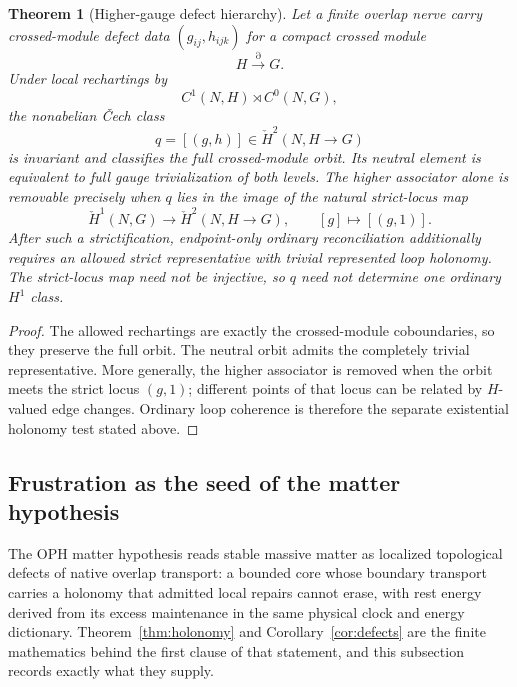 \documentclass[11pt]{article}
\newtheorem{theorem}{Theorem}[section]
\theoremstyle{remark}
\theoremstyle{plain}
\begin{document}
\begin{theorem}[Higher-gauge defect hierarchy]\label{thm:higherdefects}
Let a finite overlap nerve carry crossed-module defect data \((g_{ij},h_{ijk})\) for a compact crossed module
\[
H\xrightarrow{\partial} G.
\]
Under local rechartings by
\[
C^1(N,H)\rtimes C^0(N,G),
\]
the nonabelian \v{C}ech class
\[
q=[(g,h)]\in \check H^2(N,H\to G)
\]
is invariant and classifies the full crossed-module orbit. Its neutral element is equivalent to
full gauge trivialization of both levels. The higher associator alone is removable precisely when
\(q\) lies in the image of the natural strict-locus map
\[
\check H^1(N,G)\longrightarrow\check H^2(N,H\to G),\qquad[g]\longmapsto[(g,1)].
\]
After such a strictification, endpoint-only ordinary reconciliation additionally requires an
allowed strict representative with trivial represented loop holonomy. The strict-locus map need
not be injective, so \(q\) need not determine one ordinary \(H^1\) class.
\end{theorem}

\begin{proof}
The allowed rechartings are exactly the crossed-module coboundaries, so they preserve the full
orbit. The neutral orbit admits the completely trivial representative. More generally, the higher
associator is removed when the orbit meets the strict locus \((g,1)\); different points of that
locus can be related by \(H\)-valued edge changes. Ordinary loop coherence is therefore the
separate existential holonomy test stated above.
\end{proof}

\subsection{Frustration as the seed of the matter hypothesis}
\label{sec:frustration-matter}

The OPH matter hypothesis reads stable massive matter as localized
topological defects of native overlap transport: a bounded core whose
boundary transport carries a holonomy that admitted local repairs cannot
erase, with rest energy derived from its excess maintenance in the same
physical clock and energy dictionary. Theorem~\ref{thm:holonomy} and
Corollary~\ref{cor:defects} are the finite mathematics behind the first
clause of that statement, and this subsection records exactly what they
supply.
\end{document}
